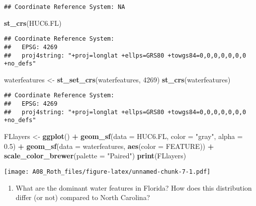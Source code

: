 \documentclass[]{article}
\newenvironment{Shaded}{\begin{snugshade}}{\end{snugshade}}
\newcommand{\DataTypeTok}[1]{\textcolor[rgb]{0.13,0.29,0.53}{#1}}
\newcommand{\DecValTok}[1]{\textcolor[rgb]{0.00,0.00,0.81}{#1}}
\newcommand{\FloatTok}[1]{\textcolor[rgb]{0.00,0.00,0.81}{#1}}
\newcommand{\KeywordTok}[1]{\textcolor[rgb]{0.13,0.29,0.53}{\textbf{#1}}}
\newcommand{\NormalTok}[1]{#1}
\newcommand{\OperatorTok}[1]{\textcolor[rgb]{0.81,0.36,0.00}{\textbf{#1}}}
\newcommand{\StringTok}[1]{\textcolor[rgb]{0.31,0.60,0.02}{#1}}
\providecommand{\tightlist}{%
  \setlength{\itemsep}{0pt}\setlength{\parskip}{0pt}}
\begin{document}
\begin{verbatim}
## Coordinate Reference System: NA
\end{verbatim}

\begin{Shaded}
\begin{Highlighting}[]
\KeywordTok{st_crs}\NormalTok{(HUC6.FL)}
\end{Highlighting}
\end{Shaded}

\begin{verbatim}
## Coordinate Reference System:
##   EPSG: 4269 
##   proj4string: "+proj=longlat +ellps=GRS80 +towgs84=0,0,0,0,0,0,0 +no_defs"
\end{verbatim}

\begin{Shaded}
\begin{Highlighting}[]
\NormalTok{waterfeatures <-}\StringTok{ }\KeywordTok{st_set_crs}\NormalTok{(waterfeatures, }\DecValTok{4269}\NormalTok{) }
\KeywordTok{st_crs}\NormalTok{(waterfeatures)}
\end{Highlighting}
\end{Shaded}

\begin{verbatim}
## Coordinate Reference System:
##   EPSG: 4269 
##   proj4string: "+proj=longlat +ellps=GRS80 +towgs84=0,0,0,0,0,0,0 +no_defs"
\end{verbatim}

\begin{Shaded}
\begin{Highlighting}[]
\NormalTok{FLlayers <-}\StringTok{ }\KeywordTok{ggplot}\NormalTok{() }\OperatorTok{+}
\StringTok{  }\KeywordTok{geom_sf}\NormalTok{(}\DataTypeTok{data =}\NormalTok{ HUC6.FL, }\DataTypeTok{color =} \StringTok{"gray"}\NormalTok{, }\DataTypeTok{alpha =} \FloatTok{0.5}\NormalTok{) }\OperatorTok{+}\StringTok{ }
\StringTok{  }\KeywordTok{geom_sf}\NormalTok{(}\DataTypeTok{data =}\NormalTok{ waterfeatures, }\KeywordTok{aes}\NormalTok{(}\DataTypeTok{color =}\NormalTok{ FEATURE)) }\OperatorTok{+}
\StringTok{  }\KeywordTok{scale_color_brewer}\NormalTok{(}\DataTypeTok{palette =} \StringTok{"Paired"}\NormalTok{)}
\KeywordTok{print}\NormalTok{(FLlayers)}
\end{Highlighting}
\end{Shaded}

\texttt{[image: A08\_Roth\_files/figure-latex/unnamed-chunk-7-1.pdf]}

\begin{enumerate}
\def\labelenumi{\arabic{enumi}.}
\setcounter{enumi}{11}
\tightlist
\item
  What are the dominant water features in Florida? How does this
  distribution differ (or not) compared to North Carolina?
\end{enumerate}
\end{document}

